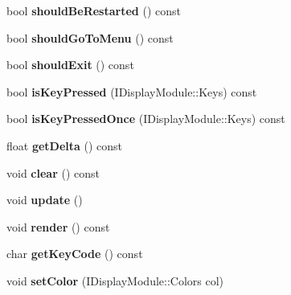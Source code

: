 \begin{DoxyCompactItemize}
\mbox{\label{class_ncurses_module_aca1755332f5b2171f11e7b711773fe81}} 
bool {\bfseries should\+Be\+Restarted} () const
\item 
\mbox{\label{class_ncurses_module_a91a4316f329fe96acdc7b7eb77b8d7d3}} 
bool {\bfseries should\+Go\+To\+Menu} () const
\item 
\mbox{\label{class_ncurses_module_aaa6e80d0f309ad4b0e21a5b28ce3dc7c}} 
bool {\bfseries should\+Exit} () const
\item 
\mbox{\label{class_ncurses_module_a63bb57e25d8907ea1c279c2472d92434}} 
bool {\bfseries is\+Key\+Pressed} (I\+Display\+Module\+::\+Keys) const
\item 
\mbox{\label{class_ncurses_module_ac2262a05fea8bb8f2983985bfafb795e}} 
bool {\bfseries is\+Key\+Pressed\+Once} (I\+Display\+Module\+::\+Keys) const
\item 
\mbox{\label{class_ncurses_module_a106afdc9d3ea86dc755472aa64cbc164}} 
float {\bfseries get\+Delta} () const
\item 
\mbox{\label{class_ncurses_module_a03acc35f3d1d2d4f3bd460b203c12dfd}} 
void {\bfseries clear} () const
\item 
\mbox{\label{class_ncurses_module_aad105ba819d27931669370ec214fb8e8}} 
void {\bfseries update} ()
\item 
\mbox{\label{class_ncurses_module_aeb5630cdf4ca110c7edcf8d709727455}} 
void {\bfseries render} () const
\item 
\mbox{\label{class_ncurses_module_adf780ad55bbbe8e9a4fcb47bfc30ac9a}} 
char {\bfseries get\+Key\+Code} () const
\item 
\mbox{\label{class_ncurses_module_a266e25068cfb13089a46931954f90061}} 
void {\bfseries set\+Color} (I\+Display\+Module\+::\+Colors col)
\item 
\mbox{\label{class_ncurses_module_afd525fcf29a4cd7079051052cb573c4b}} 

\end{DoxyCompactItemize}
